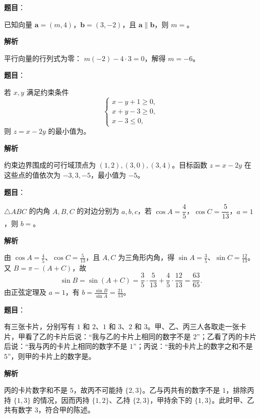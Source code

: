 \begin{answer}

\textbf{题目}：

已知向量 $\boldsymbol a=(m,4)$，$\boldsymbol b=(3,-2)$，且 $\boldsymbol a\parallel\boldsymbol b$，则 $m=$\gkblank{}。

\textbf{解析}

平行向量的行列式为零：
$m(-2)-4\cdot3=0$，解得 $m=-6$。


\end{answer}
\begin{answer}

\textbf{题目}：

若 $x,y$ 满足约束条件
\nopagebreak[4]
\[
\begin{cases}
x-y+1\geqslant0,\\
x+y-3\geqslant0,\\
x-3\leqslant0,
\end{cases}
\]
则 $z=x-2y$ 的最小值为\gkblank{}。

\textbf{解析}

约束边界围成的可行域顶点为 $(1,2),(3,0),(3,4)$。目标函数 $z=x-2y$ 在这些点的值依次为 $-3,3,-5$，最小值为 $-5$。


\end{answer}
\begin{answer}

\textbf{题目}：

$\triangle ABC$ 的内角 $A,B,C$ 的对边分别为 $a,b,c$，若 $\cos A=\dfrac45$，$\cos C=\dfrac5{13}$，$a=1$，则 $b=$\gkblank{}。

\textbf{解析}

由 $\cos A=\frac45$、$\cos C=\frac5{13}$，且 $A,C$ 为三角形内角，得 $\sin A=\frac35$、$\sin C=\frac{12}{13}$。又 $B=\pi-(A+C)$，故
\nopagebreak[4]
\[
\sin B=\sin(A+C)
=\frac35\cdot\frac5{13}+\frac45\cdot\frac{12}{13}
=\frac{63}{65}.
\]
由正弦定理及 $a=1$，有 $b=\frac{\sin B}{\sin A}=\frac{21}{13}$。


\end{answer}
\begin{answer}

\textbf{题目}：

有三张卡片，分别写有 $1$ 和 $2$、$1$ 和 $3$、$2$ 和 $3$。甲、乙、丙三人各取走一张卡片，甲看了乙的卡片后说：“我与乙的卡片上相同的数字不是 $2$”；乙看了丙的卡片后说：“我与丙的卡片上相同的数字不是 $1$”；丙说：“我的卡片上的数字之和不是 $5$”，则甲的卡片上的数字是\gkblank{}。

\textbf{解析}

丙的卡片数字和不是 $5$，故丙不可能持 $\{2,3\}$。乙与丙共有的数字不是 $1$，排除丙持 $\{1,3\}$ 的情况，因而丙持 $\{1,2\}$、乙持 $\{2,3\}$，甲持余下的 $\{1,3\}$。此时甲、乙共有数字 $3$，符合甲的陈述。


\end{answer}
